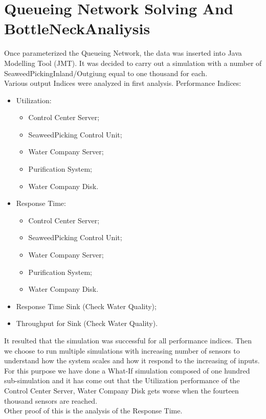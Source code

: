 \chapter{\textbf{Queueing Network Solving And BottleNeckAnaliysis}}

Once parameterized the Queueing Network, the data was inserted into Java Modelling Tool (JMT). It was decided to carry out a simulation with a number of SeaweedPickingInland/Outgiung equal to one thousand for each.\\
Various output Indices were analyzed in first analysis.
Performance Indices:
\begin{itemize}
\item Utilization:
	\begin{itemize}
		\item Control Center Server;
		\item SeaweedPicking Control Unit;
		\item Water Company Server;
		\item Purification System;
		\item Water Company Disk.
	\end{itemize}
\item Response Time:
	\begin{itemize}
		\item Control Center Server;
		\item SeaweedPicking Control Unit;
		\item Water Company Server;
		\item Purification System;
		\item Water Company Disk.
	\end{itemize}
\item Response Time Sink (Check Water Quality);
\item Throughput for Sink (Check Water Quality).
\end{itemize}

It resulted that the simulation was successful for all performance
indices. Then we choose to run multiple simulations with increasing
number of sensors to understand how the system scales and how it
respond to the increasing of inputs. For this purpose we have done a What-If simulation composed of one hundred sub-simulation and it has come out that the Utilization performance of the Control Center Server, Water Company Disk gets worse when the fourteen thousand sensors are reached.\\
Other proof of this is the analysis of the Response Time.

